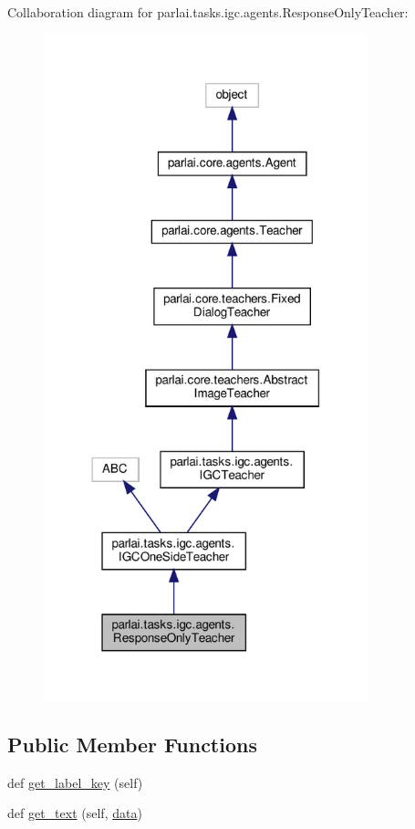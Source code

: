 Collaboration diagram for parlai.\+tasks.\+igc.\+agents.\+Response\+Only\+Teacher\+:
\nopagebreak
\begin{figure}[H]
\begin{center}
\leavevmode
\includegraphics[width=266pt]{d9/dbd/classparlai_1_1tasks_1_1igc_1_1agents_1_1ResponseOnlyTeacher__coll__graph}
\end{center}
\end{figure}
\subsection*{Public Member Functions}
\begin{DoxyCompactItemize}
\item 
def \hyperlink{classparlai_1_1tasks_1_1igc_1_1agents_1_1ResponseOnlyTeacher_a8320fd459b88bc75ab63410607708e62}{get\+\_\+label\+\_\+key} (self)
\item 
def \hyperlink{classparlai_1_1tasks_1_1igc_1_1agents_1_1ResponseOnlyTeacher_a668cd92c1e0e494941baa066c634748c}{get\+\_\+text} (self, \hyperlink{classparlai_1_1tasks_1_1igc_1_1agents_1_1IGCTeacher_a23adac78cbb7a5761f66fea8809bcee4}{data})
\end{DoxyCompactItemize}
